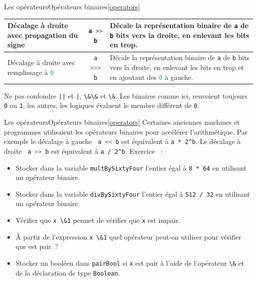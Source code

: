 \documentclass{beamer}
\begin{document}
\begin{frame}{Les opérateurs}{Opérateurs binaires\cref{operators}}
\begin{scriptsize}
\begin{table}[h!]
\begin{tabular}{|p{3cm}|c|p{6cm}|}
                \hline
                Décalage à droite avec propagation du signe                             & \lstinline[language=Javascript]!a >> b!  & Décale la représentation binaire de \lstinline[language=Javascript]!a! de \lstinline[language=Javascript]!b! bits vers la droite, en enlevant les bits en trop.                                                                \\
                \hline
                Décalage à droite avec remplissage à \lstinline[language=Javascript]!0! & \lstinline[language=Javascript]!a >>> b! & Décale la représentation binaire de \lstinline[language=Javascript]!a! de \lstinline[language=Javascript]!b! bits vers la droite, en enlevant les bits en trop et en ajoutant des \lstinline[language=Javascript]!0! à gauche. \\
                \hline
            \end{tabular}
        \end{table}
        \begin{dangercolorbox}
            Ne pas confondre \lstinline{||} et \lstinline{|}, \lstinline{\&\&} et \lstinline{\&}.
            Les binaires comme ici, renvoient toujours \lstinline{0} ou \lstinline{1}, les autres, les logiques évaluent le membre différent de \lstinline{0}.
        \end{dangercolorbox}
    \end{scriptsize}
\end{frame}

\begin{frame}{Les opérateurs}{Opérateurs binaires\cref{operators}}
    Certaines anciennes machines et programmes utilisaient les opérateurs binaires pour accélérer l'arithmétique.
    Par exemple le décalage à gauche \lstinline[language=Javascript]! a << b! est équivalent à \lstinline{a * 2^b}.
    Le décalage à droite \lstinline[language=Javascript]! a >> b! est équivalent à \lstinline{a / 2^b}.
    \bigbreak
    Exercice \execcounterdispinc{}~:
    \begin{itemize}
        \item Stocker dans la variable
              \lstinline{multBySixtyFour} l'entier égal à \lstinline{8 * 64} en utilisant un
              opérateur binaire.
        \item Stocker dans la variable
              \lstinline{divBySixtyFour} l'entier égal à \lstinline{512 / 32} en utilisant un
              opérateur binaire.
        \item Vérifier que \lstinline{x \&1} permet de vérifier que \lstinline{x} est impair.
        \item À partir de l'expression \lstinline{x \&1} quel opérateur peut-on utiliser pour vérifier que est pair~?
        \item Stocker un booléen dans \lstinline{pairBool} si \lstinline{x} est pair à l'aide
              de l'opérateur \lstinline{\&} et de la déclaration de type \lstinline{Boolean}.
    \end{itemize}
\end{frame}
\end{document}
